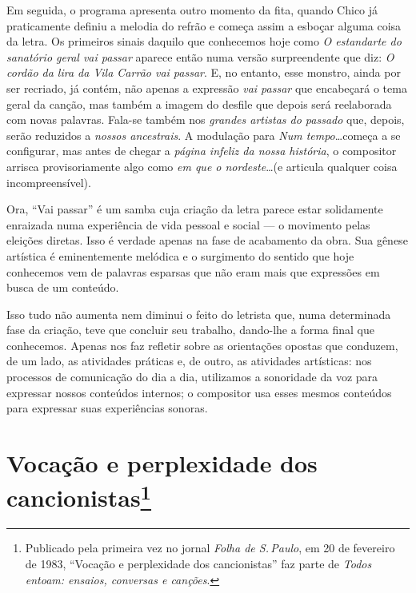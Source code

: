 Em seguida, o programa apresenta outro momento da fita, quando Chico já
praticamente definiu a melodia do refrão e começa assim a esboçar alguma
coisa da letra. Os primeiros sinais daquilo que conhecemos hoje como \textit{O
estandarte do sanatório geral vai passar} aparece então numa versão
surpreendente que diz: \textit{O cordão da lira da Vila Carrão vai passar}.
E, no entanto, esse monstro, ainda por ser recriado, já contém, não
apenas a expressão \textit{vai passar} que encabeçará o tema geral da canção,
mas também a imagem do desfile que depois será reelaborada com novas
palavras. Fala-se também nos \textit{grandes artistas do passado} que,
depois, serão reduzidos a \textit{nossos ancestrais}. A modulação para \textit{Num
tempo}\ldots começa a se configurar, mas antes de chegar a \textit{página
infeliz da nossa história}, o compositor arrisca provisoriamente algo
como \textit{em que o nordeste}\ldots (e articula qualquer coisa
incompreensível).

Ora, ``Vai passar'' é um samba cuja criação da letra parece estar
solidamente enraizada numa experiência de vida pessoal e social
 --- o movimento pelas eleições diretas. Isso é verdade apenas na fase de
acabamento da obra. Sua gênese artística é eminentemente melódica e o
surgimento do sentido que hoje conhecemos vem de palavras esparsas que
não eram mais que expressões em busca de um conteúdo.

Isso tudo não aumenta nem diminui o feito do letrista que, numa determinada fase da criação, teve que concluir seu trabalho, dando-lhe a
forma final que conhecemos. Apenas nos faz refletir sobre as orientações
opostas que conduzem, de um lado, as atividades práticas e, de outro, as
atividades artísticas: nos processos de comunicação do dia a dia,
utilizamos a sonoridade da voz para expressar nossos conteúdos internos;
o compositor usa esses mesmos conteúdos para expressar suas experiências
sonoras.


\chapter{Vocação e perplexidade dos cancionistas\footnote{Publicado pela primeira vez no jornal \textit{Folha de S.\,Paulo}, em 20 de fevereiro de 1983, ``Vocação e perplexidade dos
cancionistas'' faz parte de \textit{Todos entoam: ensaios, conversas e canções}.}}


